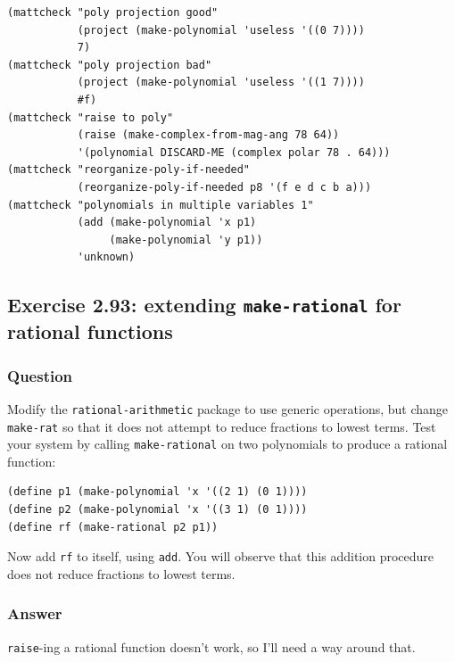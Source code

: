 \documentclass[final,fleqn,titlepage,twoside]{article}
\begin{document}
\begin{verbatim}
(mattcheck "poly projection good"
           (project (make-polynomial 'useless '((0 7))))
           7)
(mattcheck "poly projection bad"
           (project (make-polynomial 'useless '((1 7))))
           #f)
(mattcheck "raise to poly"
           (raise (make-complex-from-mag-ang 78 64))
           '(polynomial DISCARD-ME (complex polar 78 . 64)))
(mattcheck "reorganize-poly-if-needed"
           (reorganize-poly-if-needed p8 '(f e d c b a)))
(mattcheck "polynomials in multiple variables 1"
           (add (make-polynomial 'x p1)
                (make-polynomial 'y p1))
           'unknown)
\end{verbatim}

\subsection{Exercise 2.93: extending \texttt{make-rational} for rational functions}
\label{sec:org08d2326}
\subsubsection{Question}
\label{sec:org72ea720}
Modify the \texttt{rational-arithmetic} package to use generic operations, but change
\texttt{make-rat} so that it does not attempt to reduce fractions to lowest
terms. Test your system by calling \texttt{make-rational} on two polynomials
to produce a rational function:

\begin{verbatim}
(define p1 (make-polynomial 'x '((2 1) (0 1))))
(define p2 (make-polynomial 'x '((3 1) (0 1))))
(define rf (make-rational p2 p1))
\end{verbatim}

Now add \texttt{rf} to itself, using \texttt{add}. You will observe that
this addition procedure does not reduce fractions to lowest terms.

\subsubsection{Answer}
\label{sec:orgcc36c41}
\texttt{raise}-ing a rational function doesn't work, so I'll need a way around that.
\end{document}
